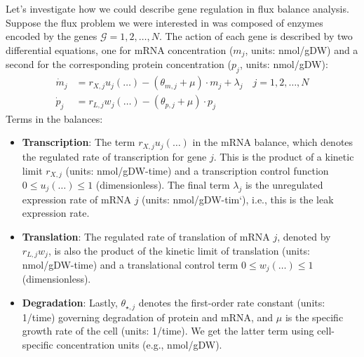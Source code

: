 \documentclass{article}[11pt]
\begin{document}
Let's investigate how we could describe gene regulation in flux balance analysis. 
Suppose the flux problem we were interested in was composed of enzymes encoded by the genes $\mathcal{G}=1,2,\dots, N$.
The action of each gene is described by two differential equations, one for mRNA concentration ($m_{j}$, units: nmol/gDW) 
and a second for the corresponding protein concentration ($p_{j}$, units: nmol/gDW):
\begin{align*}
	\dot{m}_{j} &= r_{X,j}u_{j}\left(\dots\right) - \left(\theta_{m,j}+\mu\right)\cdot{m_{j}}+\lambda_{j}\quad{j=1,2,\dots,N}\\
	\dot{p}_{j} &= r_{L,j}w_{j}\left(\dots\right) - \left(\theta_{p,j}+\mu\right)\cdot{p_{j}}
\end{align*}
Terms in the balances:
\begin{itemize}[leftmargin=16pt]
\item{\textbf{Transcription}: The term $r_{X,j}u_{j}\left(\dots\right)$ in the mRNA balance, which denotes the regulated rate of transcription for gene $j$. This is 
the product of a kinetic limit $r_{X,j}$ (units: nmol/gDW-time) and a transcription control function $0\leq{u_{j}\left(\dots\right)}\leq{1}$ (dimensionless).
The final term $\lambda_{j}$ is the unregulated expression rate of mRNA $j$ (units: nmol/gDW-tim`), i.e., this is the leak expression rate.}
\item{\textbf{Translation}: The regulated rate of translation of mRNA $j$, denoted by $r_{L,j}w_{j}$, is also the product of the
kinetic limit of translation (units: nmol/gDW-time) and a translational control term $0\leq{w_{j}\left(\dots\right)}\leq{1}$ (dimensionless).}
\item{\textbf{Degradation}: Lastly, $\theta_{\star,j}$ denotes the first-order rate constant (units: 1/time) governing degradation of protein and mRNA, and $\mu$ 
is the specific growth rate of the cell (units: 1/time). We get the latter term using cell-specific concentration units (e.g., nmol/gDW).}
\end{itemize}
\end{document}
